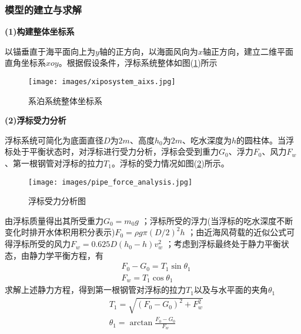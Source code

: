         \subsubsection{模型的建立与求解}
            \par
            \textbf{(1)构建整体坐标系}
            \par
            以锚垂直于海平面向上为$y$轴的正方向，以海面风向为$x$轴正方向，建立二维平面直角坐标系$xoy$。根据假设条件，浮标系统整体如图(\ref{fig:系泊系统整体坐标系})所示
            \begin{figure}[H]
            \centering
            \texttt{[image: images/xiposystem\_aixs.jpg]}
            \caption{系泊系统整体坐标系}
            \label{fig:系泊系统整体坐标系}
            \end{figure}
            \par
            \textbf{(2)浮标受力分析}
            \par
            浮标系统可简化为底面直径$D$为$2m$、高度$h_0$为$2m$、吃水深度为$h$的圆柱体。当浮标处于平衡状态时，对浮标进行受力分析，浮标会受到重力$G_0$、浮力$F_0$、风力$F_w$、第一根钢管对浮标的拉力$T_1$。浮标的受力情况如图(\ref{fig:浮标受力分析图})所示。
            \begin{figure}[H]
            \centering
            \texttt{[image: images/pipe\_force\_analysis.jpg]}
            \caption{浮标受力分析图}
            \label{fig:浮标受力分析图}
            \end{figure}
            \par
            由浮标质量得出其所受重力$G_0 = m_0g$ ；浮标所受的浮力(当浮标的吃水深度不断变化时排开水体积用积分表示)$F_0 = \rho g\pi (D/2)^2h$ ；由近海风荷载的近似公式可得浮标所受的风力$F_w = 0.625 D(h_0-h)v_w^2$ ；考虑到浮标最终处于静力平衡状态，由静力学平衡方程，有
            \begin{align*}
            & F_0 - G_0 = T_1\sin \theta_1\\
            & F_w = T_1\cos \theta_1
            \end{align*}
            求解上述静力方程，得到第一根钢管对浮标的拉力$T_1$以及与水平面的夹角$\theta_1$
            \begin{align*}
            & T_1 = \sqrt{(F_0-G_0)^2+ F_w^2}\\
            & \theta_1 = \arctan \frac{F_0-G_0}{F_w}
            \end{align*}
